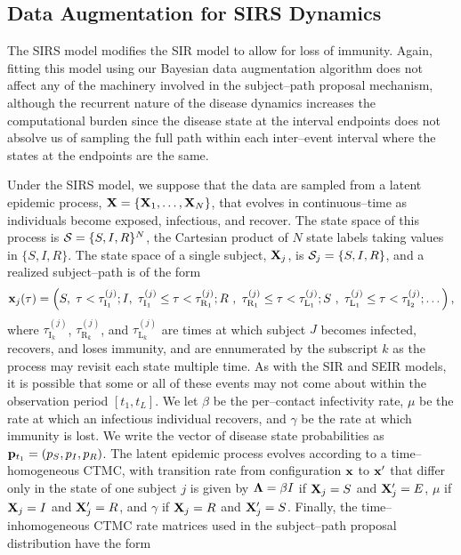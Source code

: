 \subsection{Data Augmentation for SIRS Dynamics}
\label{subsec:bda_sirs_model}

The SIRS model modifies the SIR model to allow for loss of immunity. Again, fitting this model using our Bayesian data augmentation algorithm does not affect any of the machinery involved in the subject--path proposal mechanism, although the recurrent nature of the disease dynamics increases the computational burden since the disease state at the interval endpoints does not absolve us of sampling the full path within each inter--event interval where the states at the endpoints are the same.

Under the SIRS model, we suppose that the data are sampled from a latent epidemic process, $ \mathbf{X} = \lbrace \mathbf{X}_1,\dots,\mathbf{X}_N\rbrace $, that evolves in continuous--time as individuals become exposed, infectious, and recover. The state space of this process is $ \mathcal{S} = \lbrace S,I,R\rbrace^N $, the Cartesian product of $ N $ state labels taking values in $ \lbrace S,I,R\rbrace $. The state space of a single subject, $ \mathbf{X}_j $, is $\mathcal{S}_j = \lbrace S, I, R\rbrace $, and a realized subject--path is of the form $$ \mathbf{x}_j(\tau) = \left (S,\ \tau < \tau^{(j)}_{\mathrm{I}_1}; 
	I,\ \tau^{(j)}_{\mathrm{I}_1} \leq \tau < \tau^{(j)}_{\mathrm{R}_1};
	R\ ,\ \tau^{(j)}_{\mathrm{R}_1} \leq \tau < \tau^{(j)}_{\mathrm{L}_1}; 
	S\ ,\ \tau^{(j)}_{\mathrm{L}_1} \leq \tau < \tau^{(j)}_{\mathrm{I}_2};\dots
	\right ), $$
where $ \tau^{(j)}_{\mathrm{I}_k} $, $ \tau^{(j)}_{\mathrm{R}_k} $, and $ \tau^{(j)}_{\mathrm{L}_k} $ are times at which subject $ J $ becomes infected, recovers, and loses immunity, and are ennumerated by the subscript $ k $ as the process may revisit each state multiple time. As with the SIR and SEIR models, it is possible that some or all of these events may not come about within the observation period $ [t_1,t_L] $. We let $ \beta $ be the per--contact infectivity rate, $ \mu $ be the rate at which an infectious individual recovers, and $ \gamma $ be the rate at which immunity is lost. We write the vector of disease state probabilities as $ \mathbf{p}_{t_1} = (p_S,p_I,p_R) $. The latent epidemic process evolves according to a time--homogeneous CTMC, with transition rate from configuration $ \mathbf{x} $ to $ \mathbf{x}^\prime $ that differ only in the state of one subject $ j $ is given by $ \boldsymbol{\Lambda} = \beta I $ if $ \mathbf{X}_j = S $ and $ \mathbf{X}^\prime_j = E$, $ \mu $ if $ \mathbf{X}_j = I $ and $ \mathbf{X}^\prime_j = R$, and $ \gamma $ if $ \mathbf{X}_j = R $ and $ \mathbf{X}^\prime_j = S$. Finally, the time--inhomogeneous CTMC rate matrices used in the subject--path proposal distribution have the form
